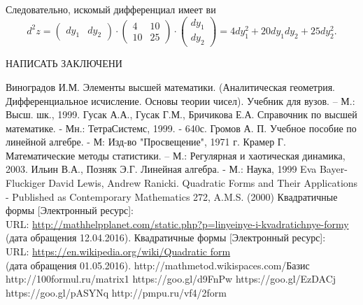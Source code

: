 \documentclass[bachelor, och, coursework, times]{SCWorks}
\begin{document}
Следовательно, искомый дифференциал имеет ви
$$d^2z=
\begin{pmatrix}
dy_1&dy_2
\end{pmatrix}\!\cdot\! 
\begin{pmatrix}
4&10\\
10&25 
\end{pmatrix}\!\cdot\! 
\begin{pmatrix}dy_1\\dy_2\end{pmatrix}= 4dy_1^2+20dy_1dy_2+25dy_2^2.$$

\conclusion
НАПИСАТЬ ЗАКЛЮЧЕНИ

\begin{thebibliography}{00} %
Виноградов И.М. Элементы высшей математики. (Аналитическая геометрия. Дифференциальное исчисление. Основы теории чисел). Учебник для вузов. – М.: Высш. шк., 1999.
Гусак А.А., Гусак Г.М., Бричикова Е.А. Справочник по высшей математике. - Мн.: ТетраСистемс, 1999. - 640с. 
Громов А. П. Учебное пособие по линейной алгебре. - М: Изд-во "Просвещение", 1971 г. 
Крамер Г. Математические методы статистики. – М.: Регулярная и хаотическая динамика, 2003. 
Ильин В.А., Позняк Э.Г. Линейная алгебра. - М.: Наука, 1999
Eva Bayer-Fluckiger David Lewis, Andrew Ranicki. Quadratic Forms and Their Applications - Published as Contemporary Mathematics 272, A.M.S. (2000)
Квадратичные формы [Электронный ресурс]:\\
URL: \href{http://mathhelpplanet.com/static.php?p=linyeinye-i-kvadratichnye-formy}{http://mathhelpplanet.com/static.php?p=linyeinye-i-kvadratichnye-formy} (дата обращения 12.04.2016).
Квадратичные формы [Электронный ресурс]:\\
URL: \href{https://en.wikipedia.org/wiki/Quadratic\underline{ }form}{https://en.wikipedia.org/wiki/Quadratic\underline{ }form} \\ (дата обращения 01.05.2016).
http://mathmetod.wikispaces.com/Базис
http://100formul.ru/matrix1
https://goo.gl/d9FnPw
https://goo.gl/EzDACj
https://goo.gl/pASYNq
http://pmpu.ru/vf4/2form
\end{thebibliography}
\end{document}
